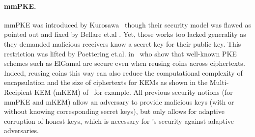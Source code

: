 \paragraph{mmPKE.}
mmPKE was introduced by Kurosawa~\cite{PKC:Kurosawa02} though their
security model was flawed as pointed out and fixed by Bellare et.al
\cite{PKC:BelBolSta03,IEEE:BelBolKur07}. Yet, those works too lacked
generality as they demanded malicious receivers know a secret key for their
public key. This restriction was lifted by Poettering et.al.
in~\cite{ASIACCS:PinPoeSch14} who show that well-known PKE schemes such as
ElGamal\cite{C:ElGamal84} are secure even
when reusing coins across ciphertexts. Indeed, reusing coins this way can
also reduce the computational complexity of encapsulation and the size of
ciphertexts for KEMs as shown in the Multi-Recipient KEM (mKEM)
of~\cite{SCN:Smart04,ICICS:CLQY18a,AC:KKPP20} for example.
%
All previous security notions (for mmPKE and mKEM) allow an adversary to
provide malicious keys (with or without knowing corresponding secret keys),
but only \cite{hashimoto2021cmpke} allows for adaptive corruption of honest keys, which is necessary for
\protITK's security against adaptive adversaries.


